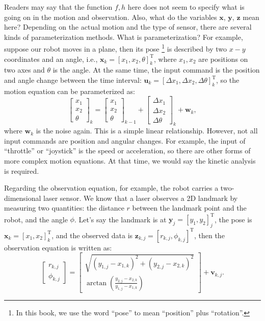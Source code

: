 Readers may say that the function $f,h$ here does not seem to specify what is going on in the motion and observation. Also, what do the variables $\mathbf{x}$, $\mathbf{y}$, $\mathbf{z}$ mean here? Depending on the actual motion and the type of sensor, there are several kinds of parameterization methods. What is parameterization? For example, suppose our robot moves in a plane, then its pose \footnote{ In this book, we use the word ``pose'' to mean ``position'' plus ``rotation''. } is described by two $x-y$ coordinates and an angle, i.e.,  $\mathbf{x}_k = [x_1,x_2,\theta]_k^\mathrm{T}$, where $x_1, x_2$ are positions on two axes and $\theta$ is the angle. At the same time, the input command is the position and angle change between the time interval: $\mathbf{u}_k = [ \Delta x_1, \Delta x_2, \Delta \theta ]_k^\mathrm{T} $, so the motion equation can be parameterized as:
\begin{equation}
{\left[ \begin{array}{l}
    x_1\\
    x_2\\
    \theta
    \end{array} \right]_k} = {\left[ \begin{array}{l}
    x_1\\
    x_2\\
    \theta
    \end{array} \right]_{k - 1}} + {\left[ \begin{array}{l}
    \Delta x_1\\
    \Delta x_2\\
    \Delta \theta
    \end{array} \right]_k} + {\mathbf{w}_k},
\end{equation}
where $\mathbf{w}_k$ is the noise again. This is a simple linear relationship. However, not all input commands are position and angular changes. For example, the input of ``throttle'' or ``joystick'' is the speed or acceleration, so there are other forms of more complex motion equations. At that time, we would say the kinetic analysis is required.

Regarding the observation equation, for example, the robot carries a two-dimensional laser sensor. We know that a laser observes a 2D landmark by measuring two quantities: the distance $r$ between the landmark point and the robot, and the angle $\phi$. Let's say the landmark is at $\mathbf{y}_j = [y_1, y_2]_j^\mathrm{T}$, the pose is $\mathbf{x}_k=[x_1,x_2]_k^\mathrm{T}$, and the observed data is $\mathbf{z}_{k,j} = [r_{k,j}, \phi_{k,j}]^\mathrm{T}$, then the observation equation is written as:
\begin{equation}
\left[ \begin{array}{l}
r_{k,j}\\
\phi_{k,j}
\end{array} \right] = \left[ \begin{array}{l}
\sqrt {{{\left(y_{1,j} - x_{1,k} \right)}^2} + {{\left( {{y_{2,j}} - x_{2,k} } \right)}^2}} \\
\arctan \left( \frac{{y_{2,j}} - x_{2,k}}{{y_{1,j} - x_{1,k}}} \right)
\end{array} \right] + \mathbf{v}_{k, j}.
\end{equation}

